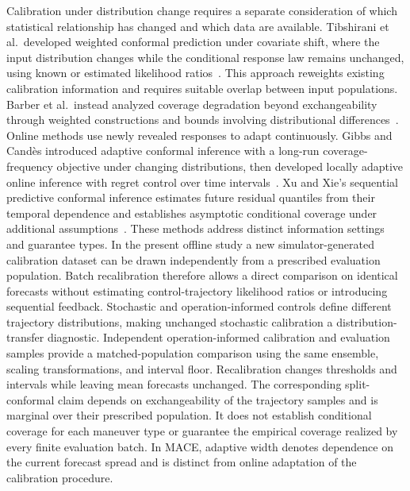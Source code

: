 Calibration under distribution change requires a separate consideration of which statistical relationship has changed and which data are available. Tibshirani et al.\ developed weighted conformal prediction under covariate shift, where the input distribution changes while the conditional response law remains unchanged, using known or estimated likelihood ratios~\cite{tibshirani2019shift}. This approach reweights existing calibration information and requires suitable overlap between input populations. Barber et al.\ instead analyzed coverage degradation beyond exchangeability through weighted constructions and bounds involving distributional differences~\cite{barber2023exchangeability}. Online methods use newly revealed responses to adapt continuously. Gibbs and Cand\`es introduced adaptive conformal inference with a long-run coverage-frequency objective under changing distributions, then developed locally adaptive online inference with regret control over time intervals~\cite{gibbs2021adaptive,gibbs2024online}. Xu and Xie's sequential predictive conformal inference estimates future residual quantiles from their temporal dependence and establishes asymptotic conditional coverage under additional assumptions~\cite{xu2023spci}. These methods address distinct information settings and guarantee types. In the present offline study a new simulator-generated calibration dataset can be drawn independently from a prescribed evaluation population. Batch recalibration therefore allows a direct comparison on identical forecasts without estimating control-trajectory likelihood ratios or introducing sequential feedback. Stochastic and operation-informed controls define different trajectory distributions, making unchanged stochastic calibration a distribution-transfer diagnostic. Independent operation-informed calibration and evaluation samples provide a matched-population comparison using the same ensemble, scaling transformations, and interval floor. Recalibration changes thresholds and intervals while leaving mean forecasts unchanged. The corresponding split-conformal claim depends on exchangeability of the trajectory samples and is marginal over their prescribed population. It does not establish conditional coverage for each maneuver type or guarantee the empirical coverage realized by every finite evaluation batch. In MACE, adaptive width denotes dependence on the current forecast spread and is distinct from online adaptation of the calibration procedure.

